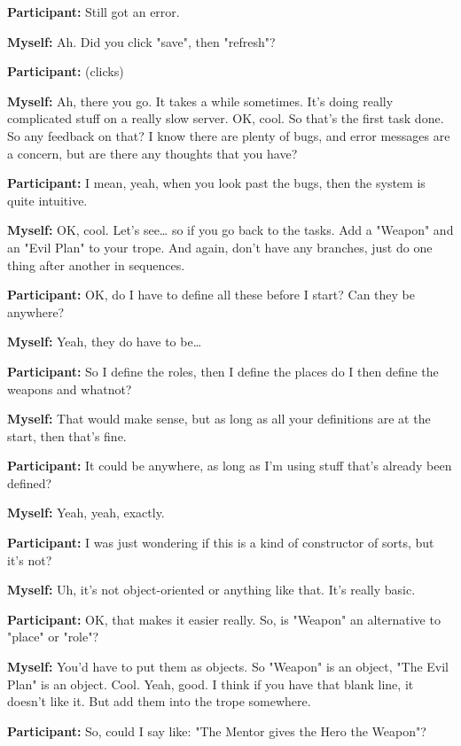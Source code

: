 \documentclass[11pt]{report}
\newcommand{\llabel}[1]{\hypertarget{llineno:#1}{\linelabel{#1}}}
\begin{document}
\begin{linenumbers}
\textbf{Participant:} Still got an error.

\textbf{Myself:} Ah. Did you click "save", then "refresh"?

\textbf{Participant:} (clicks)

\textbf{Myself:} Ah, there you go. It takes a while sometimes. It's doing really complicated stuff on a really slow server. OK, cool. So that's the first task done. So any feedback on that? I know there are plenty of bugs, and error messages are a concern, but are there any thoughts that you have?

\textbf{Participant:} I mean, yeah, when you look past the bugs, then the system
is quite intuitive.\llabel{lne:use1a}

\textbf{Myself:} OK, cool. Let's see\ldots{} so if you go back to the tasks. Add a "Weapon" and an "Evil Plan" to your trope. And again, don't have any branches, just do one thing after another in sequences.

\textbf{Participant:} OK, do I have to define all these before I start? Can they
be anywhere?\llabel{lne:syntax4a}

\textbf{Myself:} Yeah, they do have to be\ldots{}

\textbf{Participant:} So I define the roles, then I define the places do I then define the weapons and whatnot?

\textbf{Myself:} That would make sense, but as long as all your definitions are at the start, then that's fine.

\textbf{Participant:} It could be anywhere, as long as I'm using stuff that's already been defined?

\textbf{Myself:} Yeah, yeah, exactly.

\textbf{Participant:} I was just wondering if this is a kind of constructor of sorts, but it's not?

\textbf{Myself:} Uh, it's not object-oriented or anything like that. It's really basic.

\textbf{Participant:} OK, that makes it easier really. So, is "Weapon" an alternative to "place" or "role"?

\textbf{Myself:} You'd have to put them as objects. So "Weapon" is an object, "The Evil Plan" is an object. Cool. Yeah, good. I think if you have that blank line, it doesn't like it. But add them into the trope somewhere.

\textbf{Participant:} So, could I say like: "The Mentor gives the Hero the
Weapon"?\llabel{lne:feature3a}


\end{linenumbers}
\end{document}
